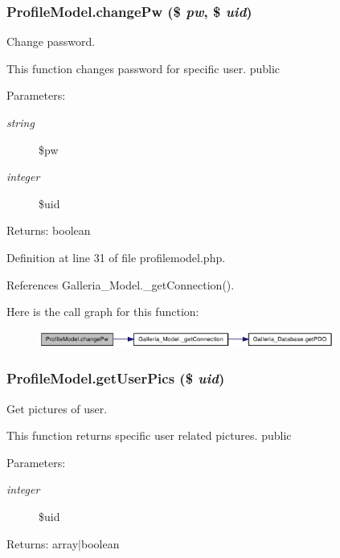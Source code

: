 \subsubsection{\setlength{\rightskip}{0pt plus 5cm}ProfileModel.changePw (\$ {\em pw}, \$ {\em uid})}\label{classProfileModel_c7ef238b61a2cc391773b4c636eb8f55}


Change password.

This function changes password for specific user.  public \begin{Desc}
\item[Parameters:]
\begin{description}
\item[{\em string}]\$pw \item[{\em integer}]\$uid \end{description}
\end{Desc}
\begin{Desc}
\item[Returns:]boolean \end{Desc}


Definition at line 31 of file profilemodel.php.

References Galleria\_\-Model.\_\-getConnection().

Here is the call graph for this function:\nopagebreak
\begin{figure}[H]
\begin{center}
\leavevmode
\includegraphics[width=275pt]{classProfileModel_c7ef238b61a2cc391773b4c636eb8f55_cgraph}
\end{center}
\end{figure}
\subsubsection{\setlength{\rightskip}{0pt plus 5cm}ProfileModel.getUserPics (\$ {\em uid})}\label{classProfileModel_209e4ead16fd0966ae0232b2e1a7b99d}


Get pictures of user.

This function returns specific user related pictures.  public \begin{Desc}
\item[Parameters:]
\begin{description}
\item[{\em integer}]\$uid \end{description}
\end{Desc}
\begin{Desc}
\item[Returns:]array$|$boolean \end{Desc}


